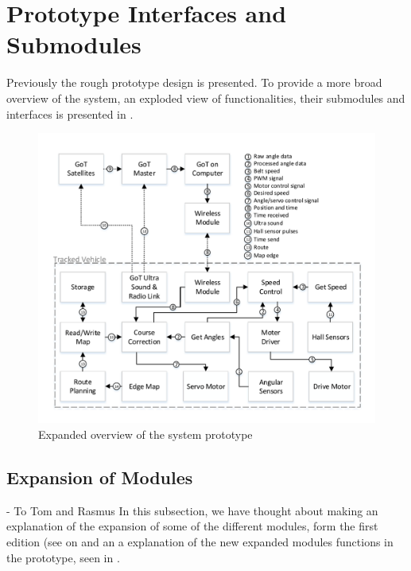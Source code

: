 \section{Prototype Interfaces and Submodules}
Previously the rough prototype design is presented. To provide a more broad overview of the system, an exploded view of functionalities, their submodules and interfaces is presented in .

\begin{figure}[H]
	\centering
	\includegraphics[scale=.9]{figures/systemOverview2}
	\caption{Expanded overview of the system prototype}
	\label{fig:systemOverview2}
\end{figure}

\subsection{Expansion of Modules}
- To Tom and Rasmus \newline
In this subsection, we have thought about making an explanation of the expansion of some of the different modules, form the first edition (see on  and an a explanation of the new expanded modules functions in the prototype, seen in .  

\indent

